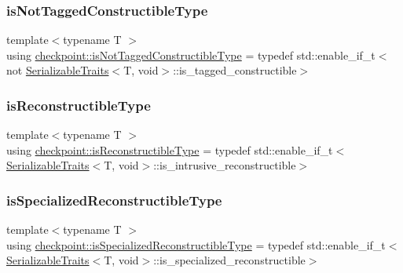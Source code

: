 \mbox{\label{namespacecheckpoint_a4eb64ee16bff7ef1609e5b98cb16cfb6}} 
\subsubsection{\texorpdfstring{is\+Not\+Tagged\+Constructible\+Type}{isNotTaggedConstructibleType}}
{\footnotesize\ttfamily template$<$typename T $>$ \\
using \hyperlink{namespacecheckpoint_a4eb64ee16bff7ef1609e5b98cb16cfb6}{checkpoint\+::is\+Not\+Tagged\+Constructible\+Type} = typedef std\+::enable\+\_\+if\+\_\+t$<$not \hyperlink{structcheckpoint_1_1_serializable_traits}{Serializable\+Traits}$<$T, void$>$\+::is\+\_\+tagged\+\_\+constructible$>$}

\mbox{\label{namespacecheckpoint_a126da7cae6bbbec231bb2552dc3ad6cc}} 
\subsubsection{\texorpdfstring{is\+Reconstructible\+Type}{isReconstructibleType}}
{\footnotesize\ttfamily template$<$typename T $>$ \\
using \hyperlink{namespacecheckpoint_a126da7cae6bbbec231bb2552dc3ad6cc}{checkpoint\+::is\+Reconstructible\+Type} = typedef std\+::enable\+\_\+if\+\_\+t$<$\hyperlink{structcheckpoint_1_1_serializable_traits}{Serializable\+Traits}$<$T, void$>$\+::is\+\_\+intrusive\+\_\+reconstructible$>$}

\mbox{\label{namespacecheckpoint_a30b2672bbbe0c21d2b88edb1ddaec19a}} 
\subsubsection{\texorpdfstring{is\+Specialized\+Reconstructible\+Type}{isSpecializedReconstructibleType}}
{\footnotesize\ttfamily template$<$typename T $>$ \\
using \hyperlink{namespacecheckpoint_a30b2672bbbe0c21d2b88edb1ddaec19a}{checkpoint\+::is\+Specialized\+Reconstructible\+Type} = typedef std\+::enable\+\_\+if\+\_\+t$<$\hyperlink{structcheckpoint_1_1_serializable_traits}{Serializable\+Traits}$<$T, void$>$\+::is\+\_\+specialized\+\_\+reconstructible$>$}

